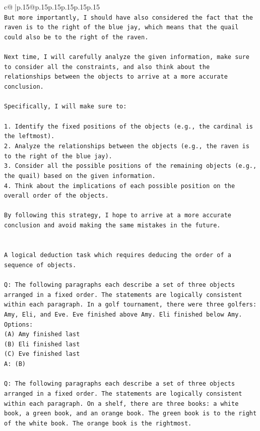 \documentclass{article}
\begin{document}
{\begin{supertabular}{c@{$\;$}|p{.15\linewidth}@{}p{.15\linewidth}p{.15\linewidth}p{.15\linewidth}p{.15\linewidth}p{.15\linewidth}}
{{{\\ 
\texttt{But more importantly, I should have also considered the fact that the raven is to the right of the blue jay, which means that the quail could also be to the right of the raven. } \\
\\ 
\texttt{Next time, I will carefully analyze the given information, make sure to consider all the constraints, and also think about the relationships between the objects to arrive at a more accurate conclusion. } \\
\\ 
\texttt{Specifically, I will make sure to:} \\
\\ 
\texttt{1. Identify the fixed positions of the objects (e.g., the cardinal is the leftmost).} \\
\texttt{2. Analyze the relationships between the objects (e.g., the raven is to the right of the blue jay).} \\
\texttt{3. Consider all the possible positions of the remaining objects (e.g., the quail) based on the given information.} \\
\texttt{4. Think about the implications of each possible position on the overall order of the objects.} \\
\\ 
\texttt{By following this strategy, I hope to arrive at a more accurate conclusion and avoid making the same mistakes in the future.} \\
\\ 
\\ 
\texttt{A logical deduction task which requires deducing the order of a sequence of objects.} \\
\\ 
\texttt{Q: The following paragraphs each describe a set of three objects arranged in a fixed order. The statements are logically consistent within each paragraph. In a golf tournament, there were three golfers: Amy, Eli, and Eve. Eve finished above Amy. Eli finished below Amy.} \\
\texttt{Options:} \\
\texttt{(A) Amy finished last} \\
\texttt{(B) Eli finished last} \\
\texttt{(C) Eve finished last} \\
\texttt{A: (B)} \\
\\ 
\texttt{Q: The following paragraphs each describe a set of three objects arranged in a fixed order. The statements are logically consistent within each paragraph. On a shelf, there are three books: a white book, a green book, and an orange book. The green book is to the right of the white book. The orange book is the rightmost.} \\
}}}
\end{supertabular}}
\end{document}
